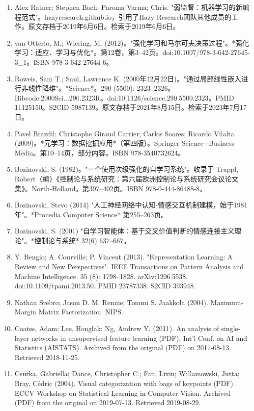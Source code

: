 \begin{enumerate}
\item Alex Ratner; Stephen Bach; Paroma Varma; Chris. "弱监督：机器学习的新编程范式"。hazyresearch.github.io，引用了Hazy Research团队其他成员的工作。原文存档于2019年6月6日。检索于2019年6月6日。  
\item van Otterlo, M.; Wiering, M. (2012)。"强化学习和马尔可夫决策过程"。*强化学习：适应、学习与优化*。第12卷，第3–42页。doi:10.1007/978-3-642-27645-3_1。ISBN 978-3-642-27644-6。  
\item Roweis, Sam T.; Saul, Lawrence K. (2000年12月22日)。"通过局部线性嵌入进行非线性降维"。*Science*。290 (5500): 2323–2326。Bibcode:2000Sci...290.2323R。doi:10.1126/science.290.5500.2323。PMID 11125150。S2CID 5987139。原文存档于2021年8月15日。检索于2023年7月17日。  
\item Pavel Brazdil; Christophe Giraud Carrier; Carlos Soares; Ricardo Vilalta (2009)。*元学习：数据挖掘应用*（第四版）。Springer Science+Business Media。第10–14页，部分内容。ISBN 978-3540732624。  
\item Bozinovski, S. (1982)。"一个使用次级强化的自学习系统"。收录于 Trappl, Robert（编）《控制论与系统研究：第六届欧洲控制论与系统研究会议论文集》。North-Holland。第397–402页。ISBN 978-0-444-86488-8。  
\item Bozinovski, Stevo (2014) "人工神经网络中认知-情感交互机制建模，始于1981年"。*Procedia Computer Science* 第255–263页。  
\item Bozinovski, S. (2001) "自学习智能体：基于交叉价值判断的情感连接主义理论"。*控制论与系统* 32(6) 637–667。
\item Y. Bengio; A. Courville; P. Vincent (2013). "Representation Learning: A Review and New Perspectives". IEEE Transactions on Pattern Analysis and Machine Intelligence. 35 (8): 1798–1828. arXiv:1206.5538. doi:10.1109/tpami.2013.50. PMID 23787338. S2CID 393948.
\item Nathan Srebro; Jason D. M. Rennie; Tommi S. Jaakkola (2004). Maximum-Margin Matrix Factorization. NIPS.
\item Coates, Adam; Lee, Honglak; Ng, Andrew Y. (2011). An analysis of single-layer networks in unsupervised feature learning (PDF). Int'l Conf. on AI and Statistics (AISTATS). Archived from the original (PDF) on 2017-08-13. Retrieved 2018-11-25.
\item Csurka, Gabriella; Dance, Christopher C.; Fan, Lixin; Willamowski, Jutta; Bray, Cédric (2004). Visual categorization with bags of keypoints (PDF). ECCV Workshop on Statistical Learning in Computer Vision. Archived (PDF) from the original on 2019-07-13. Retrieved 2019-08-29.

\end{enumerate}
